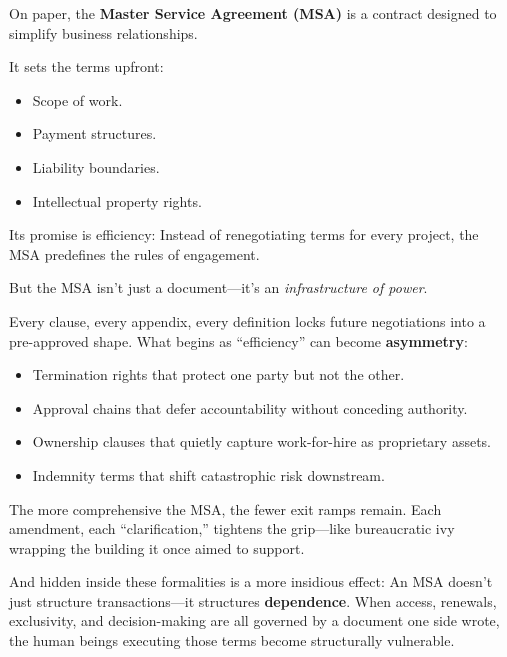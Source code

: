 \begin{tcolorbox}[colback=blue!5!white, colframe=blue!50!black, breakable,
  title={Philosophical Sidebar: The Master Service Agreement as a Weapon of Control}]

On paper, the \textbf{Master Service Agreement (MSA)} is a contract designed to simplify business relationships.

It sets the terms upfront:
\begin{itemize}
    \item Scope of work.
    \item Payment structures.
    \item Liability boundaries.
    \item Intellectual property rights.
\end{itemize}

Its promise is efficiency:  
Instead of renegotiating terms for every project, the MSA predefines the rules of engagement.

\medskip

But the MSA isn’t just a document—it’s an \textit{infrastructure of power}.

Every clause, every appendix, every definition locks future negotiations into a pre-approved shape.  
What begins as “efficiency” can become \textbf{asymmetry}:
\begin{itemize}
    \item Termination rights that protect one party but not the other.
    \item Approval chains that defer accountability without conceding authority.
    \item Ownership clauses that quietly capture work-for-hire as proprietary assets.
    \item Indemnity terms that shift catastrophic risk downstream.
\end{itemize}

The more comprehensive the MSA, the fewer exit ramps remain.  
Each amendment, each “clarification,” tightens the grip—like bureaucratic ivy wrapping the building it once aimed to support.

\medskip

And hidden inside these formalities is a more insidious effect:  
An MSA doesn’t just structure transactions—it structures \textbf{dependence}.  
When access, renewals, exclusivity, and decision-making are all governed by a document one side wrote, the human beings executing those terms become structurally vulnerable.


\end{tcolorbox}
